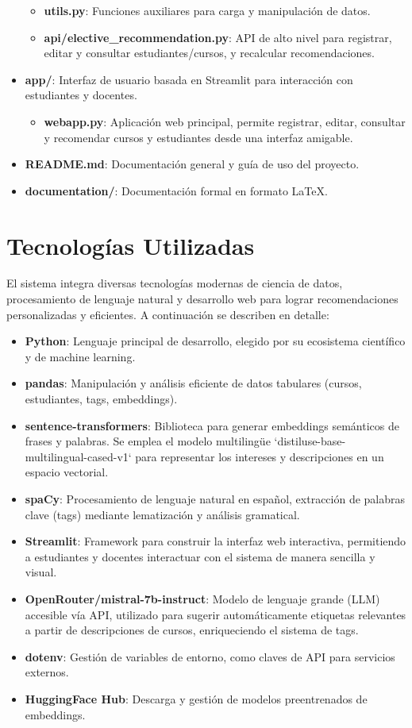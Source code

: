 \documentclass[12pt]{article}
\begin{document}
\begin{itemize}
\begin{itemize}
        \item \textbf{utils.py}: Funciones auxiliares para carga y manipulación de datos.
        \item \textbf{api/elective\_recommendation.py}: API de alto nivel para registrar, editar y consultar estudiantes/cursos, y recalcular recomendaciones.
    \end{itemize}
    \item \textbf{app/}: Interfaz de usuario basada en Streamlit para interacción con estudiantes y docentes.
    \begin{itemize}
        \item \textbf{webapp.py}: Aplicación web principal, permite registrar, editar, consultar y recomendar cursos y estudiantes desde una interfaz amigable.
    \end{itemize}
    \item \textbf{README.md}: Documentación general y guía de uso del proyecto.
    \item \textbf{documentation/}: Documentación formal en formato \LaTeX{}.
\end{itemize}

\section{Tecnologías Utilizadas}
El sistema integra diversas tecnologías modernas de ciencia de datos, procesamiento de lenguaje natural y desarrollo web para lograr recomendaciones personalizadas y eficientes. A continuación se describen en detalle:

\begin{itemize}
    \item \textbf{Python}: Lenguaje principal de desarrollo, elegido por su ecosistema científico y de machine learning.
    \item \textbf{pandas}: Manipulación y análisis eficiente de datos tabulares (cursos, estudiantes, tags, embeddings).
    \item \textbf{sentence-transformers}: Biblioteca para generar embeddings semánticos de frases y palabras. Se emplea el modelo multilingüe `distiluse-base-multilingual-cased-v1` para representar los intereses y descripciones en un espacio vectorial.
    \item \textbf{spaCy}: Procesamiento de lenguaje natural en español, extracción de palabras clave (tags) mediante lematización y análisis gramatical.
    \item \textbf{Streamlit}: Framework para construir la interfaz web interactiva, permitiendo a estudiantes y docentes interactuar con el sistema de manera sencilla y visual.
    \item \textbf{OpenRouter/mistral-7b-instruct}: Modelo de lenguaje grande (LLM) accesible vía API, utilizado para sugerir automáticamente etiquetas relevantes a partir de descripciones de cursos, enriqueciendo el sistema de tags.
    \item \textbf{dotenv}: Gestión de variables de entorno, como claves de API para servicios externos.
    \item \textbf{HuggingFace Hub}: Descarga y gestión de modelos preentrenados de embeddings.
\end{itemize}
\end{document}
